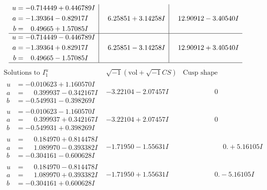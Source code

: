 \documentclass[1p]{elsarticle_modified}
\theoremstyle{definition}
\newcommand{\I}{\sqrt{-1}}
\begin{document}
$$\begin{array}{c|c|c}
\begin{aligned}
u &= -0.714449 + 0.446789 I \\
a &= -1.39364 - 0.82917 I \\
b &= \phantom{-}0.49665 + 1.57085 I\end{aligned}
 & \phantom{-}6.25851 + 3.14258 I & \phantom{-}12.90912 - 3.40540 I \\ \hline\begin{aligned}
u &= -0.714449 - 0.446789 I \\
a &= -1.39364 + 0.82917 I \\
b &= \phantom{-}0.49665 - 1.57085 I\end{aligned}
 & \phantom{-}6.25851 - 3.14258 I & \phantom{-}12.90912 + 3.40540 I\\
 \hline 
 \end{array}$$\newpage$$\begin{array}{c|c|c}  
\text{Solutions to }I^u_{1}& \I (\text{vol} + \sqrt{-1}CS) & \text{Cusp shape}\\
 \hline 
\begin{aligned}
u &= -0.010623 + 1.160570 I \\
a &= \phantom{-}0.399937 - 0.342167 I \\
b &= -0.549931 - 0.398269 I\end{aligned}
 & -3.22104 - 2.07457 I & \phantom{-0.000000 } 0 \\ \hline\begin{aligned}
u &= -0.010623 - 1.160570 I \\
a &= \phantom{-}0.399937 + 0.342167 I \\
b &= -0.549931 + 0.398269 I\end{aligned}
 & -3.22104 + 2.07457 I & \phantom{-0.000000 } 0 \\ \hline\begin{aligned}
u &= \phantom{-}0.184970 + 0.814478 I \\
a &= \phantom{-}1.089970 - 0.393382 I \\
b &= -0.304161 - 0.600628 I\end{aligned}
 & -1.71950 - 1.55631 I & \phantom{-0.000000 -}0. + 5.16105 I \\ \hline\begin{aligned}
u &= \phantom{-}0.184970 - 0.814478 I \\
a &= \phantom{-}1.089970 + 0.393382 I \\
b &= -0.304161 + 0.600628 I\end{aligned}
 & -1.71950 + 1.55631 I & \phantom{-0.000000 } 0. - 5.16105 I \\ \hline\begin{aligned}

\end{aligned}
\end{array}$$
\end{document}

